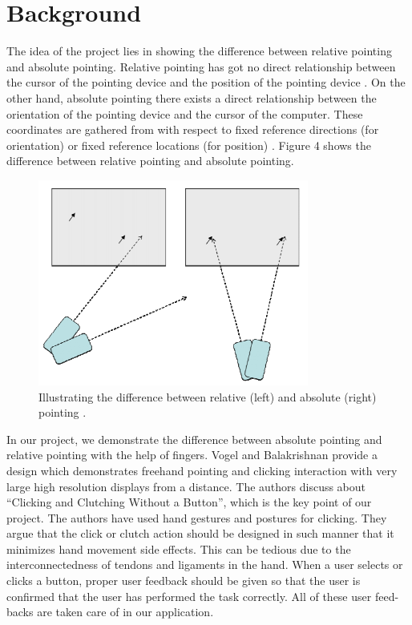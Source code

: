 \documentclass{article}
\begin{document}
\section{Background}
The idea of the project lies in showing the difference between relative pointing and absolute pointing. Relative pointing has got no direct relationship between the cursor of the pointing device and the position of the pointing device \cite{2}. On the other hand, absolute pointing there exists a direct relationship between the orientation of the pointing device and the cursor of the computer. These coordinates are gathered from with respect to fixed reference directions (for orientation) or fixed reference locations (for position) \cite{2}. Figure 4 shows the difference between relative pointing and absolute pointing. 

\begin{figure}[!h]
\centering
\includegraphics[width=3.5in]{Figure_4}
\caption{Illustrating the difference between relative (left) and absolute (right) pointing \cite{2}.}
\end{figure}

In our project, we demonstrate the difference between absolute pointing and relative pointing with the help of fingers. Vogel and Balakrishnan \cite{3} provide a design which demonstrates freehand pointing and clicking interaction with very large high resolution displays from a distance. The authors discuss about “Clicking and Clutching Without a Button”, which is the key point of our project. The authors have used hand gestures and postures for clicking. They argue that the click or clutch action should be designed in such manner that it minimizes hand movement side effects. This can be tedious due to the interconnectedness of tendons and ligaments in the hand. When a user selects or clicks a button, proper user feedback should be given so that the user is confirmed that the user has performed the task correctly. All of these user feed-backs are taken care of in our application.
\end{document}
